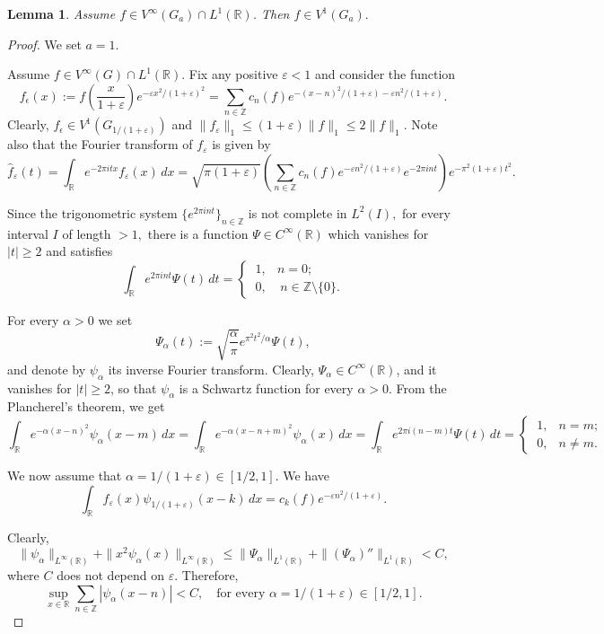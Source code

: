 \documentclass[12pt]{amsart}
\numberwithin{equation}{section}
\theoremstyle{plain}
\newtheorem{lemma}[theorem]{Lemma}
\theoremstyle{definition}
\newcommand{\R}{{\mathbb R}} \newcommand{\Q}{{\mathbb Q}} \newcommand{\Z}{{\mathbb Z}} \newcommand{\N}{{\mathbb N}}
\begin{document}
\begin{lemma}\label{lgf}
    Assume $f\in V^\infty(G_a)\cap L^1(\R)$. Then $f\in V^1(G_a).$
\end{lemma}

\begin{proof} We set $a=1.$

  Assume $f\in V^\infty(G)\cap L^1(\R)$. Fix any positive $\varepsilon<1$ and consider the function 
 $$f_\epsilon(x):=f\left(\frac{x}{1+\varepsilon}\right)e^{-\varepsilon x^2/(1+\varepsilon)^2}=\sum_{n\in\Z}c_n(f)e^{-(x-n)^2/(1+\varepsilon)-\varepsilon n^2/(1+\varepsilon)}.$$Clearly, $f_\epsilon\in V^1(G_{1/(1+\varepsilon)})$ and $\|f_\varepsilon\|_1\leq (1+\varepsilon)\|f\|_1\leq 2\|f\|_1.$ Note also that the Fourier transform of $f_\varepsilon$ is given by
 $$\hat f_\varepsilon(t)=\int_\R e^{-2\pi i tx}f_\varepsilon(x)\,dx=\sqrt{\pi(1+\varepsilon)}\left(\sum_{n\in\Z}c_n(f)e^{-\varepsilon n^2/(1+\varepsilon)}e^{-2\pi i n t}\right) e^{-\pi^2(1+\varepsilon)t^2}.$$

    Since the trigonometric system $\{e^{2\pi int}\}_{n\in\Z}$ is not complete in $L^2(I),$ for every interval $I$ of length $>1,$ there is a function $\Psi\in C^\infty(\R)$ which vanishes for $|t|\geq 2$ and satisfies 
    $$\int_\R e^{2\pi int}\Psi(t)\,dt=
    \begin{cases}
 \  1,& n=0;\\
 \ 0,& \ n\in\Z\setminus\{0\}.
\end{cases}
   $$

For every $\alpha>0$ we set $$\Psi_\alpha(t):=\sqrt{\frac{\alpha}{\pi}}e^{\pi^2 t^2/\alpha}\Psi(t),$$and denote by $\psi_\alpha$ its inverse Fourier transform. Clearly, $\Psi_\alpha\in C^\infty(\R)$, and   it vanishes for $|t|\geq 2 $, so that $\psi_\alpha$ is a Schwartz function for every $\alpha>0.$ From the Plancherel's theorem, we get
$$\int_\R e^{-\alpha(x-n)^2}\psi_\alpha(x-m)\,dx=\int_\R e^{-\alpha(x-n+m)^2}\psi_\alpha(x)\,dx=\int_\R e^{2\pi i(n-m)t}\Psi(t)\,dt= \begin{cases}
 \  1,& n=m;\\
 \ 0,&  n \neq m.
\end{cases}$$

We now assume that $\alpha=1/(1+\varepsilon)\in[1/2,1]$. We have
\begin{equation}\label{eq:ortck}
    \int_\R f_\varepsilon(x) \psi_{1/(1+\varepsilon)}(x-k) \, dx=c_k(f)e^{-\varepsilon n^2/(1+\varepsilon)}.
\end{equation}

Clearly, 
$$\|\psi_\alpha\|_{L^\infty(\R)}+ \| x^2\psi_\alpha(x)\|_{L^\infty(\R)}\leq \|\Psi_\alpha\|_{L^1(\R)}+ \|(\Psi_\alpha)''\|_{L^1(\R)}<C,$$where $C$ does not depend on $\varepsilon.$
Therefore, 
 \begin{equation}\label{epsi}\sup_{x\in\R}\sum_{n\in\Z}|\psi_{\alpha}(x-n)| <C,\quad \text{for every } \alpha=1/(1+\varepsilon)\in [1/2,1].\end{equation}



\end{proof}
\end{document}
